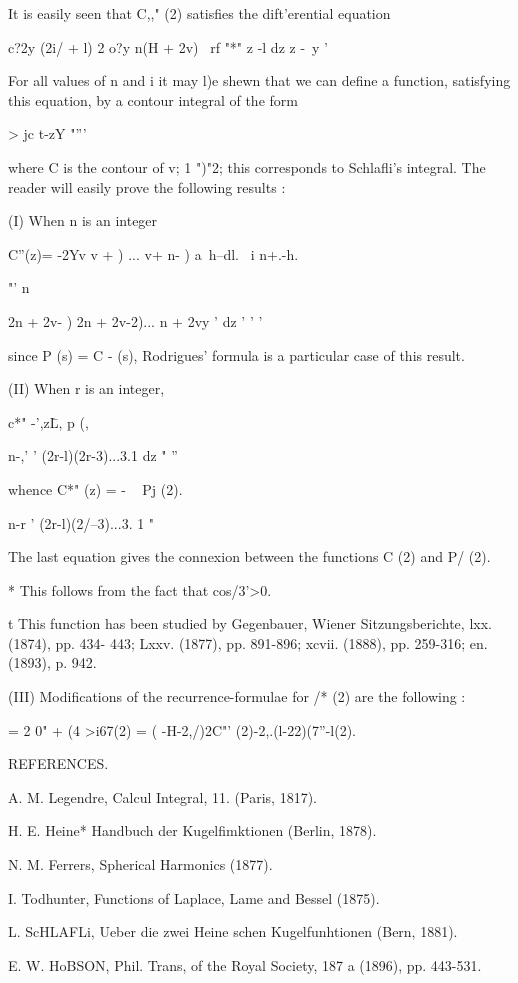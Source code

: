 {{{It is easily seen that C,," (2) satisfies the dift'erential equation

c?2y (2i/ + l) 2 o?y n(H + 2v) \ rf "*" z -l dz z -\ y '

For all values of n and i it may l)e shewn that we can define a
function, satisfying this equation, by a contour integral of the form

  > jc t-zY "'''

where C is the contour of v; 1 ")"2; this corresponds to Schlafli's
integral. The reader will easily prove the following results :

(I) When n is an integer

C''(z)= -2Yv v + ) ... v+ n- ) a\, h--dl. \ i n+.-h.

"' n\ \ {2n + 2v- ) 2n + 2v-2)... n + 2vy ' dz ' ' '

since P (s) = C - (s), Rodrigues' formula is a particular case of this
result.

(II) When r is an integer,

c*" -',z\= L, p (,\

n-,' ' (2r-l)(2r-3)...3.1 dz " ''

whence C*" (z) = - ~ Pj (2).

n-r ' (2r-l)(2/--3)...3. 1 "

The last equation gives the connexion between the functions C (2) and
P/ (2).

* This follows from the fact that cos/3'>0.

t This function has been studied by Gegenbauer, Wiener
Sitzungsberichte, lxx. (1874), pp. 434- 443; Lxxv. (1877), pp.
891-896; xcvii. (1888), pp. 259-316; en. (1893), p. 942.

%
%

(III) Modifications of the recurrence-formulae for /* (2) are the
following :

   = 2 0" + (4 >i67(2) = ( -H-2,/)2C"' (2)-2,.(l-22)(7''-l(2).

REFERENCES.

A. M. Legendre, Calcul Integral, 11. (Paris, 1817).

H. E. Heine* Handbuch der Kugelfimktionen (Berlin, 1878).

N. M. Ferrers, Spherical Harmonics (1877).

I. Todhunter, Functions of Laplace, Lame and Bessel (1875).

L. ScHLAFLi, Ueber die zwei Heine schen Kugelfunhtionen (Bern, 1881).

E. W. HoBSON, Phil. Trans, of the Royal Society, 187 a (1896), pp.
443-531.

}}}}
